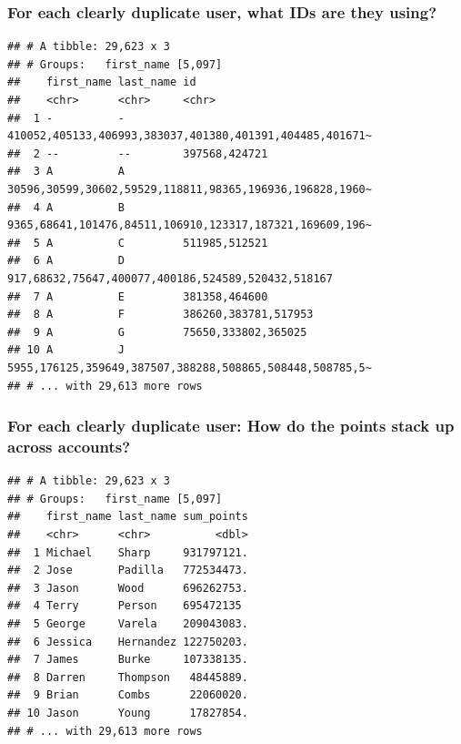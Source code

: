 \documentclass[
]{article}
\begin{document}
\hypertarget{for-each-clearly-duplicate-user-what-ids-are-they-using}{%
\subsubsection{\texorpdfstring{For each \textbf{clearly} duplicate user,
what IDs are they
using?}{For each clearly duplicate user, what IDs are they using?}}\label{for-each-clearly-duplicate-user-what-ids-are-they-using}}

\begin{verbatim}
## # A tibble: 29,623 x 3
## # Groups:   first_name [5,097]
##    first_name last_name id                                                      
##    <chr>      <chr>     <chr>                                                   
##  1 -          -         410052,405133,406993,383037,401380,401391,404485,401671~
##  2 --         --        397568,424721                                           
##  3 A          A         30596,30599,30602,59529,118811,98365,196936,196828,1960~
##  4 A          B         9365,68641,101476,84511,106910,123317,187321,169609,196~
##  5 A          C         511985,512521                                           
##  6 A          D         917,68632,75647,400077,400186,524589,520432,518167      
##  7 A          E         381358,464600                                           
##  8 A          F         386260,383781,517953                                    
##  9 A          G         75650,333802,365025                                     
## 10 A          J         5955,176125,359649,387507,388288,508865,508448,508785,5~
## # ... with 29,613 more rows
\end{verbatim}

\hypertarget{for-each-clearly-duplicate-user-how-do-the-points-stack-up-across-accounts}{%
\subsubsection{\texorpdfstring{For each \textbf{clearly} duplicate user:
How do the points stack up across
accounts?}{For each clearly duplicate user: How do the points stack up across accounts?}}\label{for-each-clearly-duplicate-user-how-do-the-points-stack-up-across-accounts}}

\begin{verbatim}
## # A tibble: 29,623 x 3
## # Groups:   first_name [5,097]
##    first_name last_name sum_points
##    <chr>      <chr>          <dbl>
##  1 Michael    Sharp     931797121.
##  2 Jose       Padilla   772534473.
##  3 Jason      Wood      696262753.
##  4 Terry      Person    695472135 
##  5 George     Varela    209043083.
##  6 Jessica    Hernandez 122750203.
##  7 James      Burke     107338135.
##  8 Darren     Thompson   48445889.
##  9 Brian      Combs      22060020.
## 10 Jason      Young      17827854.
## # ... with 29,613 more rows
\end{verbatim}
\end{document}
